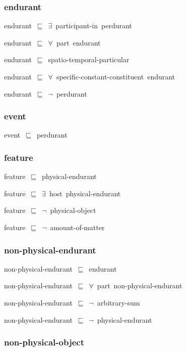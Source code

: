 \documentclass{article}
\begin{document}
\subsubsection*{endurant}

endurant~\ensuremath{\sqsubseteq}~\ensuremath{\exists}~participant-in~perdurant~

endurant~\ensuremath{\sqsubseteq}~\ensuremath{\forall}~part~endurant~

endurant~\ensuremath{\sqsubseteq}~spatio-temporal-particular~

endurant~\ensuremath{\sqsubseteq}~\ensuremath{\forall}~specific-constant-constituent~endurant~

endurant~\ensuremath{\sqsubseteq}~\ensuremath{\lnot}~perdurant

\subsubsection*{event}

event~\ensuremath{\sqsubseteq}~perdurant~

\subsubsection*{feature}

feature~\ensuremath{\sqsubseteq}~physical-endurant~

feature~\ensuremath{\sqsubseteq}~\ensuremath{\exists}~host~physical-endurant~

feature~\ensuremath{\sqsubseteq}~\ensuremath{\lnot}~physical-object

feature~\ensuremath{\sqsubseteq}~\ensuremath{\lnot}~amount-of-matter

\subsubsection*{non-physical-endurant}

non-physical-endurant~\ensuremath{\sqsubseteq}~endurant~

non-physical-endurant~\ensuremath{\sqsubseteq}~\ensuremath{\forall}~part~non-physical-endurant~

non-physical-endurant~\ensuremath{\sqsubseteq}~\ensuremath{\lnot}~arbitrary-sum

non-physical-endurant~\ensuremath{\sqsubseteq}~\ensuremath{\lnot}~physical-endurant

\subsubsection*{non-physical-object}
\end{document}
